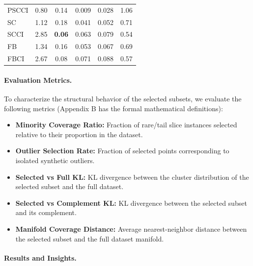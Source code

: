 \documentclass[11pt]{article}
\begin{document}
\begin{table}[t]
{\begin{tabular}{lccccc}
PSCCI 
& 0.80 
& 0.14 
& \cellcolor{silverrank!35}0.009 
& \cellcolor{silverrank!35}0.028 
& 1.06 \\

SC 
& 1.12 
& 0.18 
& 0.041 
& 0.052 
& 0.71 \\

SCCI 
& \cellcolor{silverrank!35}2.85 
& \cellcolor{goldrank!35}\textbf{0.06} 
& 0.063 
& 0.079 
& \cellcolor{silverrank!35} 0.54 \\

FB 
& 1.34 
& 0.16 
& 0.053 
& 0.067 
& 0.69 \\

FBCI 
& \cellcolor{bronzerank!35}2.67 
& \cellcolor{silverrank!35}0.08 
& 0.071 
& 0.088 
& \cellcolor{bronzerank!35}0.57 \\

\bottomrule
\end{tabular}
}
\end{table}
\paragraph{Evaluation Metrics.}
To characterize the structural behavior of the selected subsets, we evaluate the following metrics (Appendix B has the formal mathematical definitions):

\begin{itemize}
    \item \textbf{Minority Coverage Ratio:} Fraction of rare/tail slice instances selected relative to their proportion in the dataset.

    \item \textbf{Outlier Selection Rate:} Fraction of selected points corresponding to isolated synthetic outliers.

    \item \textbf{Selected vs Full KL:} KL divergence between the cluster distribution of the selected subset and the full dataset.

    \item \textbf{Selected vs Complement KL:} KL divergence between the selected subset and its complement.

    \item \textbf{Manifold Coverage Distance:} Average nearest-neighbor distance between the selected subset and the full dataset manifold.
\end{itemize}


\paragraph{Results and Insights.}
\end{document}
